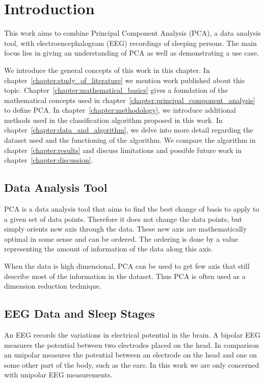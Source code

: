 \chapter{Introduction}
\label{chapter:introduction}

This work aims to combine Principal Component Analysis (PCA), a data analysis tool, with electroencephalogram (EEG) recordings of sleeping persons. The main focus lies in giving an understanding of PCA as well as demonstrating a use case.

We introduce the general concepts of this work in this chapter. In chapter~\ref{chapter:study_of_literature} we mention work published about this topic. Chapter~\ref{chapter:mathematical_basics} gives a foundation of the mathematical concepts used in chapter~\ref{chapter:principal_component_analysis} to define PCA. In chapter~\ref{chapter:methodology}, we introduce additional methods used in the classification algorithm proposed in this work. In chapter~\ref{chapter:data_and_algorithm}, we delve into more detail regarding the dataset used and the functioning of the algorithm. We compare the algorithm in chapter~\ref{chapter:results} and discuss limitations and possible future work in chapter~\ref{chapter:discussion}.

\section{Data Analysis Tool}

PCA is a data analysis tool that aims to find the best change of basis to apply to a given set of data points. Therefore it does not change the data points, but simply orients new axis through the data. These new axis are mathematically optimal in some sense and can be ordered. The ordering is done by a value representing the amount of information of the data along this axis.

When the data is high dimensional, PCA can be used to get few axis that still describe most of the information in the dataset. Thus PCA is often used as a dimension reduction technique.


\section{EEG Data and Sleep Stages}
\label{sec:eeg_data_and_sleep_stages}

An EEG records the variations in electrical potential in the brain. A bipolar EEG measures the potential between two electrodes placed on the head. In comparison an unipolar measures the potential between an electrode on the head and one on some other part of the body, such as the ears. In this work we are only concerned with unipolar EEG measurements.

